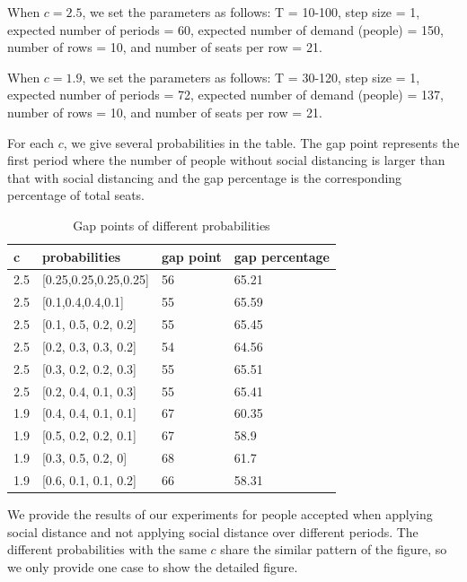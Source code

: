 When $c = 2.5$, we set the parameters as follows: T = 10-100, step size = 1, expected number of periods = 60, expected number of demand (people) = 150, number of rows = 10, and number of seats per row = 21.

When $c = 1.9$, we set the parameters as follows: T = 30-120, step size = 1, expected number of periods = 72, expected number of demand (people) = 137, number of rows = 10, and number of seats per row = 21.

For each $c$, we give several probabilities in the table. The gap point represents the first period where the number of people without social distancing is larger than that with social distancing and the gap percentage is the corresponding percentage of total seats.




\begin{table}[ht]
  \centering
  \caption{Gap points of different probabilities}
  \begin{tabular}{|l|l|l|l|}
  \hline
  c  & probabilities & gap point & gap percentage \\
  \hline
  2.5  & [0.25,0.25,0.25,0.25] & 56 & 65.21 \\
  2.5  & [0.1,0.4,0.4,0.1] & 55 & 65.59 \\
  2.5  & [0.1, 0.5, 0.2, 0.2] & 55 & 65.45 \\
  2.5  & [0.2, 0.3, 0.3, 0.2] & 54 & 64.56 \\
  2.5  & [0.3, 0.2, 0.2, 0.3] & 55 & 65.51\\
  2.5  & [0.2, 0.4, 0.1, 0.3] & 55 & 65.41 \\
  1.9  & [0.4, 0.4, 0.1, 0.1] & 67 & 60.35 \\
  1.9  & [0.5, 0.2, 0.2, 0.1] & 67 & 58.9  \\
  1.9  & [0.3, 0.5, 0.2, 0]  &  68 & 61.7  \\
  1.9  & [0.6, 0.1, 0.1, 0.2] & 66 & 58.31 \\
  \hline
  \end{tabular}
\end{table}


We provide the results of our experiments for people accepted when applying social distance and not applying social distance over different periods. The different probabilities with the same $c$ share the similar pattern of the figure, so we only provide one case to show the detailed figure.


